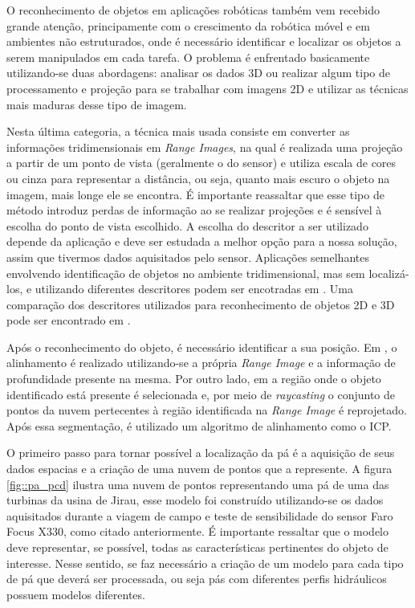 O reconhecimento de objetos em aplicações robóticas também vem recebido
grande atenção, principamente com o crescimento da robótica móvel e em ambientes
não estruturados, onde é necessário identificar e localizar os objetos a serem
manipulados em cada tarefa. O problema é enfrentado basicamente utilizando-se
duas abordagens: analisar os dados 3D ou realizar algum tipo de processamento e
projeção para se trabalhar com imagens 2D e utilizar as técnicas mais maduras
desse tipo de imagem.

Nesta última categoria, a técnica
mais usada consiste em converter as informações tridimensionais em \textit{Range
Images}, na qual é realizada uma projeção a partir de um ponto de vista (geralmente o do sensor) e utiliza escala
de cores ou cinza para representar a distância, ou seja, quanto mais escuro o
objeto na imagem, mais longe ele se encontra. É importante reassaltar que esse
tipo de método introduz perdas de informação ao se realizar projeções e é
sensível à escolha do ponto de vista escolhido. 
A escolha do descritor a ser
utilizado depende da aplicação e deve ser estudada a melhor opção para a nossa
solução, assim que tivermos dados aquisitados pelo sensor. Aplicações
semelhantes envolvendo identificação de objetos no ambiente tridimensional, mas
sem localizá-los, e utilizando diferentes descritores podem ser encotradas em
\cite{Bayramoglu2010,Hetzel2001,Chen2007}. Uma comparação dos descritores
utilizados para reconhecimento de objetos 2D e 3D pode ser encontrado em \cite{Zaharia2004, Weber2014}.

Após o reconhecimento do objeto, é necessário identificar a sua posição.
Em \cite{Steder2009}, o alinhamento é realizado utilizando-se a própria
\textit{Range Image} e a informação de profundidade presente na mesma. Por outro
lado, em \cite{Nuchter2005} a região onde o objeto identificado está presente é
selecionada e, por meio de \textit{raycasting} o conjunto de pontos da nuvem
pertecentes à região identificada na \textit{Range Image} é reprojetado. Após
essa segmentação, é utilizado um algoritmo de alinhamento como o ICP.

O primeiro passo para tornar possível a localização da pá é a aquisição de seus
dados espacias e a criação de uma nuvem de pontos que a represente. A
figura \ref{fig::pa_pcd} ilustra uma nuvem de pontos representando uma pá de uma das
turbinas da usina de Jirau, esse modelo foi construído utilizando-se os dados
aquisitados durante a viagem de campo e teste de sensibilidade do sensor Faro
Focus X330, como citado anteriormente. É importante ressaltar que o
modelo deve representar, se possível, todas as características pertinentes do objeto de interesse. Nesse
sentido, se faz necessário a criação de um modelo para cada tipo de pá que
deverá ser processada, ou seja pás com diferentes perfis hidráulicos possuem
modelos diferentes.


